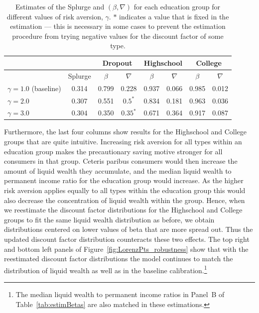 \documentclass[../HAFiscal]{subfiles}
\begin{document}
\begin{table}[t]
\begin{center}
\begin{tabular}{lc|cccccc} 
	\toprule
	& & \multicolumn{2}{c}{Dropout} & \multicolumn{2}{c}{Highschool} & \multicolumn{2}{c}{College} \\ \midrule 
	& Splurge & $\beta$ & $\nabla$ & $\beta$ & $\nabla$ & $\beta$ & $\nabla$ \\ \midrule 
	$\gamma = 1.0$ (baseline) & 0.314 & 0.799 & 0.228 & 0.937 & 0.066 & 0.985 & 0.012 \\ 
	$\gamma = 2.0$ & 0.307 & 0.551 & $0.5^*$ & 0.834 & 0.181 & 0.963 & 0.036 \\
	$\gamma = 3.0$ & 0.304 & 0.350 & $0.35^*$ & 0.671 & 0.364 & 0.917 & 0.087 
	\\ \bottomrule 
\end{tabular}
\end{center}
\caption{Estimates of the Splurge and $(\beta,\nabla)$ for each education group for different values of risk aversion, $\gamma$. $*$ indicates a value that is fixed in the estimation --- this is necessary in some cases to prevent the estimation procedure from trying negative values for the discount factor of some type.}
\label{tab:robustness_gamma}
\end{table}

Furthermore, the last four columns show results for the Highschool and College groups that are quite intuitive. Increasing risk aversion for all types within an education group makes the precautionary saving motive stronger for all consumers in that group. Ceteris paribus consumers would then increase the amount of liquid wealth they accumulate, and the median liquid wealth to permanent income ratio for the education group would increase. As the higher risk aversion applies equally to all types within the education group this would also decrease the concentration of liquid wealth within the group. Hence, when we reestimate the discount factor distributions for the Highschool and College groups to fit the same liquid wealth distribution as before, we obtain distributions centered on lower values of beta that are more spread out. Thus the updated discount factor distribution counteracts these two effects. The top right and bottom left panels of Figure~\ref{fig:LorenzPts_robustness} show that with the reestimated discount factor distributions the model continues to match the distribution of liquid wealth as well as in the baseline calibration.\footnote{The median liquid wealth to permanent income ratios in Panel~B of Table~\ref{tab:estimBetas} are also matched in these estimations.} 
\end{document}
